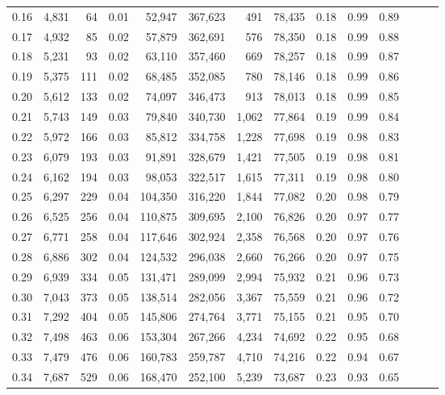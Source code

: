 \begin{tabular}{rrrrrrrrrrrrrr}
0.16 &  4,831 &     64 &  0.01 &   52,947 &  367,623 &     491 &  78,435 &  0.18 &  0.99 &      0.89 \\
0.17 &  4,932 &     85 &  0.02 &   57,879 &  362,691 &     576 &  78,350 &  0.18 &  0.99 &      0.88 \\
0.18 &  5,231 &     93 &  0.02 &   63,110 &  357,460 &     669 &  78,257 &  0.18 &  0.99 &      0.87 \\
0.19 &  5,375 &    111 &  0.02 &   68,485 &  352,085 &     780 &  78,146 &  0.18 &  0.99 &      0.86 \\
0.20 &  5,612 &    133 &  0.02 &   74,097 &  346,473 &     913 &  78,013 &  0.18 &  0.99 &      0.85 \\
0.21 &  5,743 &    149 &  0.03 &   79,840 &  340,730 &   1,062 &  77,864 &  0.19 &  0.99 &      0.84 \\
0.22 &  5,972 &    166 &  0.03 &   85,812 &  334,758 &   1,228 &  77,698 &  0.19 &  0.98 &      0.83 \\
0.23 &  6,079 &    193 &  0.03 &   91,891 &  328,679 &   1,421 &  77,505 &  0.19 &  0.98 &      0.81 \\
0.24 &  6,162 &    194 &  0.03 &   98,053 &  322,517 &   1,615 &  77,311 &  0.19 &  0.98 &      0.80 \\
0.25 &  6,297 &    229 &  0.04 &  104,350 &  316,220 &   1,844 &  77,082 &  0.20 &  0.98 &      0.79 \\
0.26 &  6,525 &    256 &  0.04 &  110,875 &  309,695 &   2,100 &  76,826 &  0.20 &  0.97 &      0.77 \\
0.27 &  6,771 &    258 &  0.04 &  117,646 &  302,924 &   2,358 &  76,568 &  0.20 &  0.97 &      0.76 \\
0.28 &  6,886 &    302 &  0.04 &  124,532 &  296,038 &   2,660 &  76,266 &  0.20 &  0.97 &      0.75 \\
0.29 &  6,939 &    334 &  0.05 &  131,471 &  289,099 &   2,994 &  75,932 &  0.21 &  0.96 &      0.73 \\
0.30 &  7,043 &    373 &  0.05 &  138,514 &  282,056 &   3,367 &  75,559 &  0.21 &  0.96 &      0.72 \\
0.31 &  7,292 &    404 &  0.05 &  145,806 &  274,764 &   3,771 &  75,155 &  0.21 &  0.95 &      0.70 \\
0.32 &  7,498 &    463 &  0.06 &  153,304 &  267,266 &   4,234 &  74,692 &  0.22 &  0.95 &      0.68 \\
0.33 &  7,479 &    476 &  0.06 &  160,783 &  259,787 &   4,710 &  74,216 &  0.22 &  0.94 &      0.67 \\
0.34 &  7,687 &    529 &  0.06 &  168,470 &  252,100 &   5,239 &  73,687 &  0.23 &  0.93 &      0.65 \\

\end{tabular}
